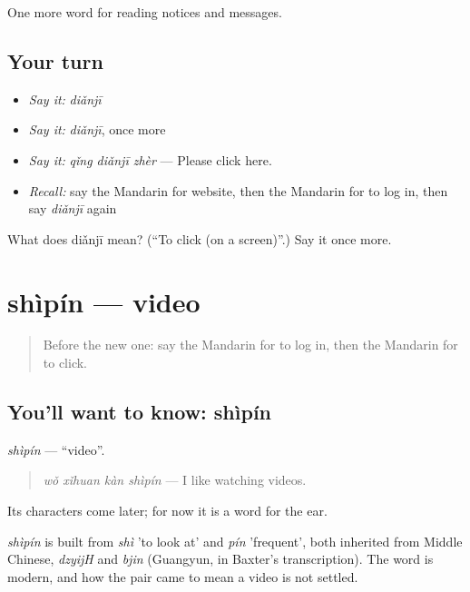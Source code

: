 \begin{grammarlens}[title={What you've built}]
One more word for reading notices and messages.
\end{grammarlens}

\subsection*{Your turn}
\begin{itemize}
\raggedright
  \item \emph{Say it:} \emph{diǎnjī}
  \item \emph{Say it:} \emph{diǎnjī}, once more
  \item \emph{Say it:} \emph{qǐng diǎnjī zhèr} — Please click here.
  \item \emph{Recall:} say the Mandarin for website, then the Mandarin for to log in, then say \emph{diǎnjī} again
\end{itemize}

\begin{tcolorbox}[breakable,colback=teal!4,colframe=teal!35!black,title={Before you move on}]
What does diǎnjī mean? (\textquotedblleft{}To click (on a screen)\textquotedblright{}.) Say it once more.
\end{tcolorbox}
\section[shìpín]{shìpín — video}

\label{lesson:ZH-C204-shipin}



\begin{quote}
Before the new one: say the Mandarin for to log in, then the Mandarin for to click.
\end{quote}

\subsection*{You'll want to know: shìpín}
\emph{shìpín} — \textquotedblleft{}video\textquotedblright{}.

\begin{quote}
\emph{wǒ xǐhuan kàn shìpín} — I like watching videos.
\end{quote}

Its characters come later; for now it is a word for the ear.

\begin{cousinweb}
\emph{shìpín} is built from \emph{shì} 'to look at' and \emph{pín} 'frequent', both inherited from Middle Chinese, \emph{dzyijH} and \emph{bjin} (Guangyun, in Baxter's transcription). The word is modern, and how the pair came to mean a video is not settled.
\end{cousinweb}

